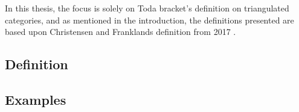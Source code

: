 In this thesis, the focus is solely on Toda bracket's definition on triangulated categories, and as mentioned in the introduction, the definitions presented are based upon Christensen and Franklands definition from 2017 \cite[Definition 3.1]{Christensen-Frankland_2017}.

\subsection{Definition}


\subsection{Examples}

